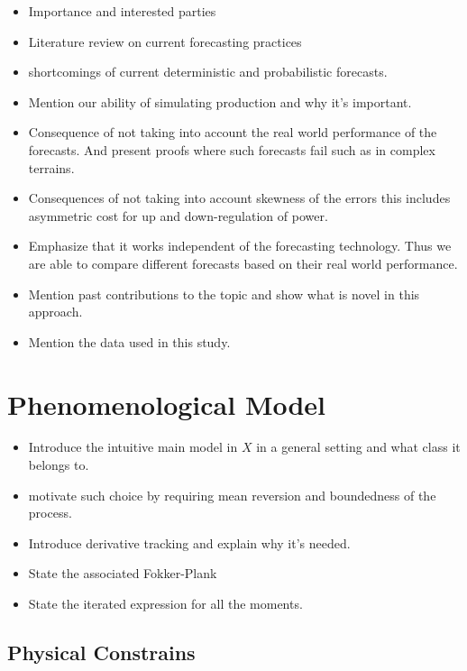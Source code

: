 \documentclass[10pt,twocolumn,letterpaper]{article}
\begin{document}
\begin{itemize}
    \item Importance and interested parties
    \item Literature review on current forecasting practices
    \item shortcomings of current deterministic and probabilistic forecasts.
    \item Mention our ability of simulating production and why it's important.
    \item Consequence of not taking into account the real world performance of the forecasts. And present proofs where such forecasts fail such as in complex terrains.
    \item Consequences of not taking into account skewness of the errors this includes asymmetric cost for up and down-regulation of power.
    \item Emphasize that it works independent of the forecasting technology. Thus we are able to compare different forecasts based on their real world performance.
    \item Mention past contributions to the topic and show what is novel in this approach.
    \item Mention the data used in this study.
\end{itemize}


\section{Phenomenological  Model}

\begin{itemize}
    \item Introduce the intuitive main model in $X$ in a general setting and what class it belongs to.
    \item motivate such choice by requiring mean reversion and boundedness of the process.
    \item Introduce derivative tracking and explain why it's needed.
    \item State the associated Fokker-Plank
    \item State the iterated expression for all the moments.
\end{itemize}



\subsection{Physical Constrains}
\end{document}
